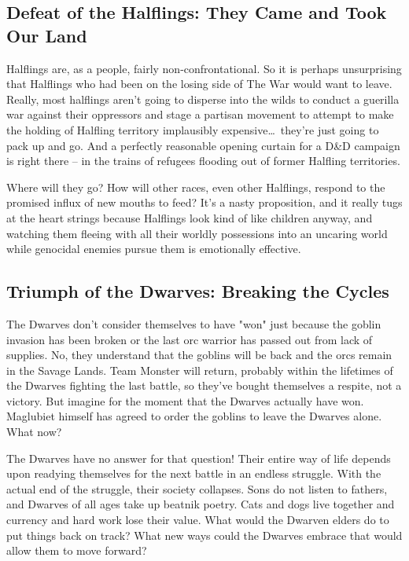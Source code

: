 \subsection{Defeat of the Halflings: They Came and Took Our Land}

Halflings are, as a people, fairly non-confrontational. So it is perhaps unsurprising that Halflings who had been on the losing side of The War would want to leave. Really, most halflings aren't going to disperse into the wilds to conduct a guerilla war against their oppressors and stage a partisan movement to attempt to make the holding of Halfling territory implausibly expensive\ldots\  they're just going to pack up and go. And a perfectly reasonable opening curtain for a D\&D campaign is right there -- in the trains of refugees flooding out of former Halfling territories.

Where will they go? How will other races, even other Halflings, respond to the promised influx of new mouths to feed? It's a nasty proposition, and it really tugs at the heart strings because Halflings look kind of like children anyway, and watching them fleeing with all their worldly possessions into an uncaring world while genocidal enemies pursue them is emotionally effective.

\subsection{Triumph of the Dwarves: Breaking the Cycles}

The Dwarves don't consider themselves to have "won" just because the goblin invasion has been broken or the last orc warrior has passed out from lack of supplies. No, they understand that the goblins will be back and the orcs remain in the Savage Lands. Team Monster will return, probably within the lifetimes of the Dwarves fighting the last battle, so they've bought themselves a respite, not a victory. But imagine for the moment that the Dwarves actually have won. Maglubiet himself has agreed to order the goblins to leave the Dwarves alone. What now?

The Dwarves have no answer for that question! Their entire way of life depends upon readying themselves for the next battle in an endless struggle. With the actual end of the struggle, their society collapses. Sons do not listen to fathers, and Dwarves of all ages take up beatnik poetry. Cats and dogs live together and currency and hard work lose their value. What would the Dwarven elders do to put things back on track? What new ways could the Dwarves embrace that would allow them to move forward?

